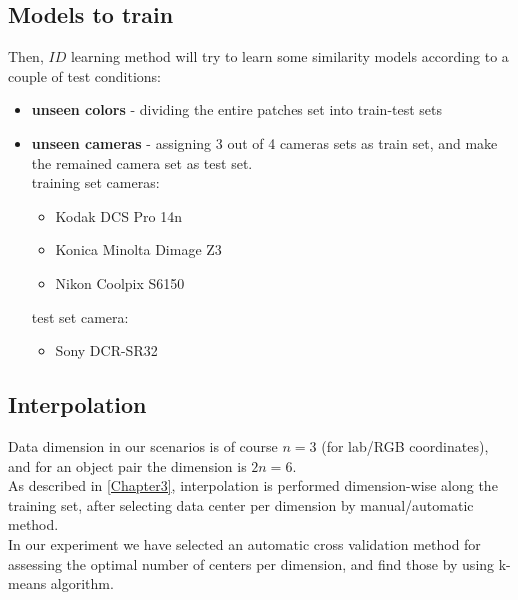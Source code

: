 \subsection{Models to train}
Then, $ID$ learning method will try to learn some similarity models according to a couple of test conditions:

\begin{itemize}
	\item \textbf{unseen colors} - dividing the entire patches set into train-test sets
	\item \textbf{unseen cameras} - assigning 3 out of 4 cameras sets as train set, and make the remained camera set as test set. \\
		training set cameras:
		\begin{itemize}
			\item Kodak DCS	Pro 14n
			\item Konica Minolta Dimage Z3
			\item Nikon Coolpix S6150
		\end{itemize}	
		
		test set camera:	
		\begin{itemize}
			\item Sony DCR-SR32
		\end{itemize}
		
\end{itemize}

\subsection{Interpolation}
Data dimension in our scenarios is of course $n=3$ (for lab/RGB \cite{RGB} coordinates), and for an object pair the dimension is $2n=6$. \\
As described in \ref{Chapter3}, interpolation is performed dimension-wise along the training set, after selecting data center per dimension by manual/automatic method.
\\
In our experiment we have selected an automatic cross validation \cite{cross validation} method for assessing the optimal number of centers per dimension, and find those by using k-means \cite{kmeans} algorithm.



